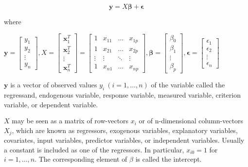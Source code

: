 \documentclass{article}
\begin{document}
\[\textbf{y} = X\boldsymbol{\beta} + \boldsymbol{\epsilon}\]

\noindent where

\bigskip

\(
\textbf{y} = 
\begin{bmatrix}
y_1\\
y_2\\
\vdots\\
y_n
\end{bmatrix}
,
X = 
\begin{bmatrix}
\textbf{x}_1^T\\
\textbf{x}_2^T\\
\vdots\\
\textbf{x}_n^T
\end{bmatrix} = 
\begin{bmatrix}
1 & x_{11} & \dots & x_{1p}\\
1 & x_{21} & \dots & x_{2p}\\
\vdots & \vdots & \ddots & \vdots\\
1 & x_{n1} & \dots & x_{np}
\end{bmatrix}
,
\boldsymbol{\beta} = 
\begin{bmatrix}
\beta_0\\
\beta_1\\
\vdots\\
\beta_p
\end{bmatrix}
,
\boldsymbol{\epsilon} = 
\begin{bmatrix}
\epsilon_1\\
\epsilon_2\\
\vdots\\
\epsilon_n
\end{bmatrix}
\)

\bigskip

\noindent \(\textbf{y}\) is a vector of observed values \(y_{i}\ (i=1,\ldots ,n)\) of the variable called the regressand, endogenous variable, response variable, measured variable, criterion variable, or dependent variable.

\bigskip

\noindent \(X\) may be seen as a matrix of row-vectors \(x_{i}\) or of n-dimensional column-vectors \(X_{j}\), which are known as regressors, exogenous variables, explanatory variables, covariates, input variables, predictor variables, or independent variables. Usually a constant is included as one of the regressors. In particular, \(x_{i0} = 1\) for \(i = 1, \dots, n\). The corresponding element of \(\beta\) is called the intercept. 
\end{document}
